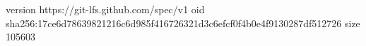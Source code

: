version https://git-lfs.github.com/spec/v1
oid sha256:17ce6d78639821216c6d985f416726321d3c6efcf0f4b0e4f9130287df512726
size 105603
